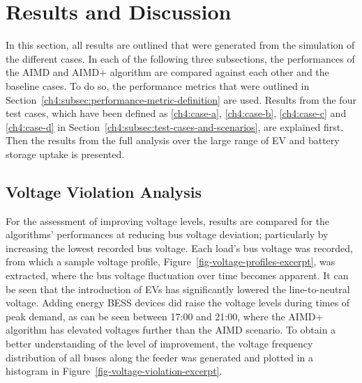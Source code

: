 \section{Results and Discussion}
\label{ch4:sec:results-and-discussion}

In this section, all results are outlined that were generated from the simulation of the different cases.
In each of the following three subsections, the performances of the AIMD and AIMD+ algorithm are compared against each other and the baseline cases.
To do so, the performance metrics that were outlined in Section~\ref{ch4:subsec:performance-metric-definition} are used.
Results from the four test cases, which have been defined as \ref{ch4:case-a}, \ref{ch4:case-b}, \ref{ch4:case-c} and \ref{ch4:case-d} in Section~\ref{ch4:subsec:test-cases-and-scenarios}, are explained first.
Then the results from the full analysis over the large range of EV and battery storage uptake is presented.

\subsection{Voltage Violation Analysis}

For the assessment of improving voltage levels, results are compared for the algorithms' performances at reducing bus voltage deviation; particularly by increasing the lowest recorded bus voltage.
Each load's bus voltage was recorded, from which a sample voltage profile, Figure~\ref{fig-voltage-profiles-excerpt}, was extracted, where the bus voltage fluctuation over time becomes apparent. It can be seen that the introduction of EVs has significantly lowered the line-to-neutral voltage. Adding energy BESS devices did raise the voltage levels during times of peak demand, as can be seen between 17:00 and 21:00, where the AIMD+ algorithm has elevated voltages further than the AIMD scenario. To obtain a better understanding of the level of improvement, the voltage frequency distribution of all buses along the feeder was generated and plotted in a histogram in Figure~\ref{fig-voltage-violation-excerpt}.


